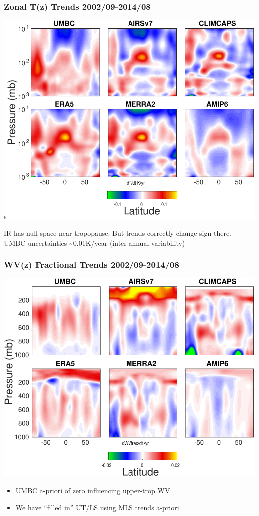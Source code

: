 \documentclass[10pt,t]{beamer}
\begin{document}
\begin{frame}
\frametitle{Zonal T(z) Trends 2002/09-2014/08}  
\vspace{-0.15in}
\begin{center}
\includegraphics[width=0.8\linewidth]{Figs2002_2014/tz_trends_2002_2014.pdf}
\end{center}

\footnotesize
IR has null space near tropopause.  But trends correctly change sign there.\\
\vspace{0.1in}
UMBC uncertainties \textasciitilde{}0.01K/year (inter-annual variability)

\end{frame}
\begin{frame}
\frametitle{WV(z) Fractional Trends 2002/09-2014/08}  
\vspace{-0.15in}
\begin{center}
\includegraphics[width=0.8\linewidth]{Figs2002_2014/wvfrac_trends_2002_2014.pdf}
\end{center}

\small
\begin{itemize}
\item UMBC a-priori of zero influencing upper-trop WV
\item We have ``filled in'' UT/LS using MLS trends a-priori
\end{itemize}

\end{frame}
\end{document}
